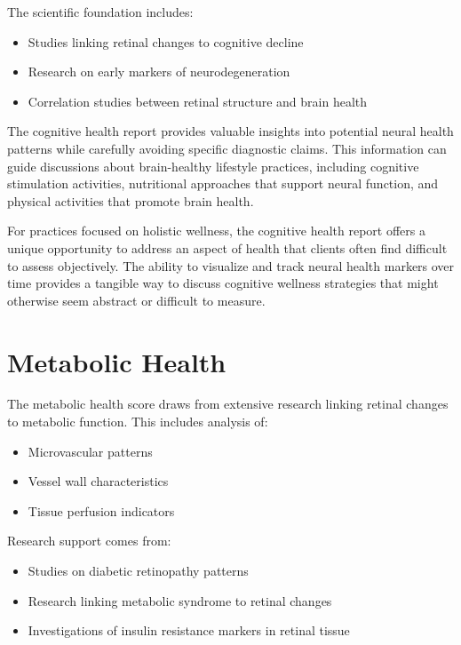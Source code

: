 \documentclass[
  Letterpaper,
]{scrbook}
\providecommand{\tightlist}{%
  \setlength{\itemsep}{0pt}\setlength{\parskip}{0pt}}\usepackage{longtable,booktabs,array}
\begin{document}
The scientific foundation includes:

\begin{itemize}
\tightlist
\item
  Studies linking retinal changes to cognitive decline
\item
  Research on early markers of neurodegeneration
\item
  Correlation studies between retinal structure and brain health
\end{itemize}

The cognitive health report provides valuable insights into potential
neural health patterns while carefully avoiding specific diagnostic
claims. This information can guide discussions about brain-healthy
lifestyle practices, including cognitive stimulation activities,
nutritional approaches that support neural function, and physical
activities that promote brain health.

For practices focused on holistic wellness, the cognitive health report
offers a unique opportunity to address an aspect of health that clients
often find difficult to assess objectively. The ability to visualize and
track neural health markers over time provides a tangible way to discuss
cognitive wellness strategies that might otherwise seem abstract or
difficult to measure.

\section{Metabolic Health}\label{metabolic-health}

The metabolic health score draws from extensive research linking retinal
changes to metabolic function. This includes analysis of:

\begin{itemize}
\tightlist
\item
  Microvascular patterns
\item
  Vessel wall characteristics
\item
  Tissue perfusion indicators
\end{itemize}

Research support comes from:

\begin{itemize}
\tightlist
\item
  Studies on diabetic retinopathy patterns
\item
  Research linking metabolic syndrome to retinal changes
\item
  Investigations of insulin resistance markers in retinal tissue
\end{itemize}
\end{document}
